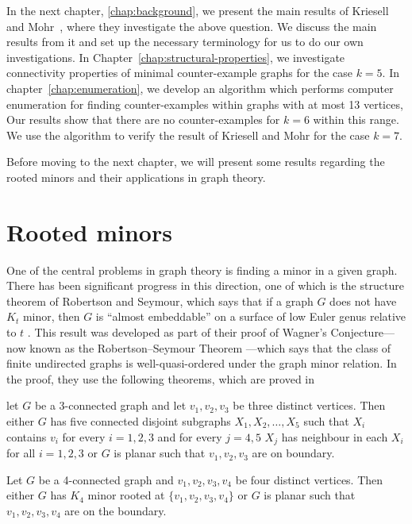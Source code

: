 In the next chapter, \ref{chap:background}, we present the main results of Kriesell and Mohr~\cite{matthias_2022}, 
where they investigate the above question. We discuss the main results from it and set up the necessary 
terminology for us to do our own investigations. In Chapter~\ref{chap:structural-properties}, 
we investigate connectivity properties of minimal counter-example graphs for the case $k = 5$. 
In chapter~\ref{chap:enumeration}, we develop an algorithm which performs computer enumeration for finding 
counter-examples within graphs with at most 13 vertices, Our results show that there are no counter-examples for $k = 6$ within this range.
We use the algorithm to verify the result of Kriesell and Mohr \cite{matthias_2022} for the case $k = 7$.


Before moving to the next chapter, we will present some results regarding the rooted minors and their applications in graph theory. 

\section{Rooted minors}
\label{section:rooted-minors}
One of the central problems in graph theory is finding a minor in a given graph. There has been significant progress 
in this direction, one of which is the structure theorem of Robertson and Seymour, which says that if a graph $G$ does not have
$K_t$ minor, then $G$ is ``almost embeddable'' on a surface of low Euler genus relative to $t$ \cite{RobertsonSeymourGM16}.
This result was developed as part of their proof of Wagner's Conjecture—now known as the Robertson–Seymour Theorem
—which says that the class of finite undirected graphs is well-quasi-ordered under the graph minor relation.
In the proof, they use the following theorems, which are proved in \cite{RobertsonSeymourGM20}

\begin{thm}
 let $G$ be a 3-connected graph and let $v_1, v_2, v_3$ be three distinct vertices. Then either $G$ has 
 five connected disjoint subgraphs $X_1, X_2, \dots, X_5$ such that $X_i$ contains $v_i$ for every $i = 1,2,3$
 and for every $j = 4,5$ $X_j$ has neighbour in each $X_i$ for all $i = 1,2,3$ or $G$ is planar such that $v_1, v_2, v_3$ are on boundary.
\end{thm}

\begin{thm}
 Let $G$ be a 4-connected graph and $v_1, v_2, v_3, v_4$ be four distinct vertices. Then either $G$ has $K_4$ minor rooted
 at $\{v_1, v_2, v_3, v_4\}$ or $G$ is planar such that $v_1, v_2, v_3, v_4$ are on the boundary.
\end{thm}

